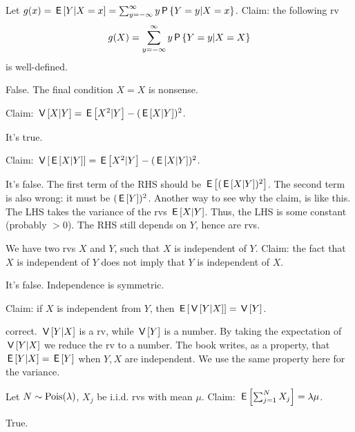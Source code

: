 \documentclass[tf-tutorial-all.tex]{subfiles}
\begin{document}
\begin{truefalse}
Let $g(x) =\,\mathsf{E}\left[Y|X=x\right] = \sum_{y=-\infty}^{\infty} y \,\mathsf{P}\left\{Y=y|X=x\right\}$.
Claim: the following rv
\begin{equation}
\label{eq:11}
g(X) = \sum_{y=-\infty}^{\infty} y \P{Y=y|X=X}
\end{equation}
is well-defined.

\begin{solution}
False. The final condition $X=X$ is nonsense.
\end{solution}
\end{truefalse}


\begin{truefalse}
Claim: $\,\mathsf{V}\left[X|Y\right] = \,\mathsf{E}\left[X^2|Y\right] - (\,\mathsf{E}\left[X|Y\right])^{2}$.

\begin{solution}
It's true.
\end{solution}
\end{truefalse}

\begin{truefalse}
Claim: $\,\mathsf{V}\left[\,\mathsf{E}\left[X|Y\right]\right] = \,\mathsf{E}\left[X^2|Y\right] - (\,\mathsf{E}\left[X|Y\right])^{2}$.

\begin{solution}
It's false. The first term of the RHS should be $\,\mathsf{E}\left[(\,\mathsf{E}\left[X|Y\right])^{2}\right]$. The second term is also wrong: it must be $(\,\mathsf{E}\left[Y\right])^{2}$. Another  way to see why the claim, is like this. The LHS takes the variance of the rvs $\,\mathsf{E}\left[X|Y\right]$. Thus, the LHS is some constant (probably $>0$). The RHS still depends on $Y$, hence are rvs.
\end{solution}
\end{truefalse}

\begin{truefalse}
We have two rvs $X$ and $Y$, such that $X$ is independent of $Y$. Claim:  the fact that $X$  is independent of $Y$ does not imply that $Y$  is independent of $X$.

\begin{solution}
It's false. Independence is symmetric.
\end{solution}
\end{truefalse}

\begin{truefalse}
Claim: if $X$ is independent from $Y$, then $\,\mathsf{E}\left[\,\mathsf{V}\left[Y|X\right]\right] = \,\mathsf{V}\left[Y\right]$.

\begin{solution}
correct. $\,\mathsf{V}\left[Y|X\right]$ is a rv, while $\,\mathsf{V}\left[Y\right]$ is a number. By taking the expectation of $\,\mathsf{V}\left[Y|X\right]$ we reduce the rv to a number.
The book writes, as a property, that $\,\mathsf{E}\left[Y|X\right] = \,\mathsf{E}\left[Y\right]$ when $Y,X$ are independent. We use the same property here for the variance.
\end{solution}
\end{truefalse}

\begin{truefalse}
Let $N \sim \mathrm{Pois}(\lambda)$, $X_j$ be i.i.d. rvs with mean $\mu$. Claim: $\,\mathsf{E}\left[\sum_{j=1}^NX_j\right]=\lambda\mu$.

\begin{solution}
True.
\end{solution}
\end{truefalse}
\end{document}
